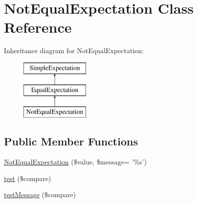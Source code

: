 \hypertarget{class_not_equal_expectation}{
\section{NotEqualExpectation Class Reference}
\label{class_not_equal_expectation}
}
Inheritance diagram for NotEqualExpectation:\begin{figure}[H]
\begin{center}
\leavevmode
\includegraphics[height=3.000000cm]{class_not_equal_expectation}
\end{center}
\end{figure}
\subsection*{Public Member Functions}
\begin{DoxyCompactItemize}
\item 
\hyperlink{class_not_equal_expectation_ab341bfe20b6160cba5bc3222b64214c1}{NotEqualExpectation} (\$value, \$message= '\%s')
\item 
\hyperlink{class_not_equal_expectation_a4d224959c7900fa36eadb05907129d4c}{test} (\$compare)
\item 
\hyperlink{class_not_equal_expectation_acdebe1e65b7080f419bdaad3a15981a0}{testMessage} (\$compare)
\end{DoxyCompactItemize}


